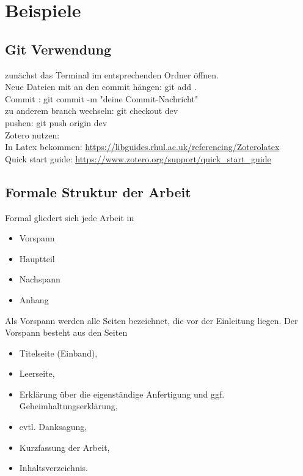 \clearpage
\chapter{\textbf{Beispiele}}\label{beispiele}


\section {Git Verwendung}

zunächst das Terminal im entsprechenden Ordner öffnen. \\
Neue Dateien mit an den commit hängen: \hspace{2cm} git add .\\
Commit : \hspace{8cm} git commit -m "deine Commit-Nachricht"\\
zu anderem branch wechseln:\hspace{2cm}  git checkout dev \\
pushen: \hspace{7cm}  git push origin dev \\

Zotero nutzen: \\
\hspace{5cm} In Latex bekommen:  \url{https://libguides.rhul.ac.uk/referencing/Zoterolatex} \\
\hspace{5cm} Quick start guide: \url{https://www.zotero.org/support/quick_start_guide}\\


\section{Formale Struktur der Arbeit}

Formal gliedert sich jede Arbeit in  
\begin{itemize}
\item Vorspann
\item Hauptteil
\item Nachspann 
\item Anhang
\end{itemize}
\vspace{0.5cm}

Als Vorspann werden alle Seiten bezeichnet, die vor der Einleitung liegen. Der Vorspann 
besteht aus den Seiten 

\begin{itemize}
\item Titelseite (Einband), 
\item Leerseite,
\item Erklärung über die eigenständige Anfertigung und ggf. Geheimhaltungserklärung, 
\item evtl. Danksagung, 
\item Kurzfassung der Arbeit,  
\item  Inhaltsverzeichnis.
\end{itemize}
\vspace{0.5cm}

